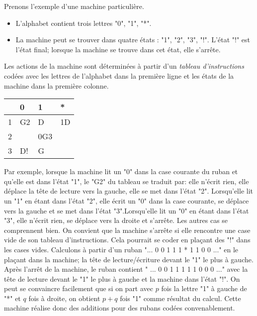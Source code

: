 Prenons l'exemple d'une machine particulière.
\begin{itemize}
  \item L'alphabet contient trois lettres "0", "1", "*".
  \item La machine peut se trouver dans quatre états : "1", "2", "3", "!". L'état "!" est l'état final; lorsque la machine se trouve dans cet état, elle s'arrête. 
\end{itemize}
Les actions de la machine sont déterminées à partir d'un \emph{tableau d'instructions} codées avec les lettres de l'alphabet dans la première ligne et les états de la machine dans la première colonne.
\begin{center}
\renewcommand{\arraystretch}{1.5}
\begin{tabular}{|l|l|l|l|} \hline
  & 0  & 1   & *  \\ \hline
1 & G2 & D   & 1D \\ \hline
2 &    & 0G3 &    \\ \hline
3 & D! & G   &    \\ \hline
\end{tabular}
\end{center}
Par exemple, lorsque la machine lit un "0" dans la case courante du ruban et qu'elle est dans l'état "1", le "G2" du tableau se traduit par: elle n'écrit rien, elle déplace la tête de lecture vers la gauche, elle se met dans l'état "2".\newline
Lorsqu'elle lit un "1" en étant dans l'état "2", elle écrit un "0" dans la case courante, se déplace vers la gauche et se met dans l'état "3".\newline Lorsqu'elle lit un "0" en étant dans l'état "3", elle n'écrit rien, se déplace vers la droite et s'arrête. Les autres cas se comprennent bien. On convient que la machine s'arrête si elle rencontre une case vide de son tableau d'instructions. Cela pourrait se coder en plaçant des "!" dans les cases vides.\newline
Calculons à partir d'un ruban "... 0 0 1 1 1 * 1 1 0 0 ..." en le plaçant dans la machine; la tête de lecture/écriture devant le "1" le plus à gauche.\newline
Après l'arrêt de la machine, le ruban contient " ... 0 0 1 1 1 1 1 0 0 0 ..." avec la tête de lecture devant le "1" le plus à gauche et la machine dans l'état "!".\newline
On peut se convaincre facilement que si on part avec $p$ fois la lettre "1" à gauche de "*" et $q$ fois à droite, on obtient $p+q$ fois "1" comme résultat du calcul. Cette machine réalise donc des additions pour des rubans codées convenablement.

